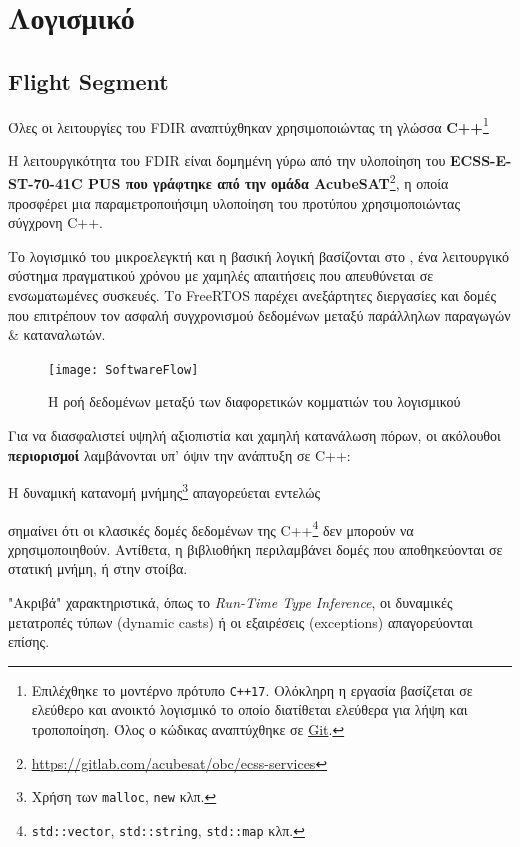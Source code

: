 \documentclass[a4paper,nobib]{tufte-book}
\begin{document}
\section{Λογισμικό}

\subsection{Flight Segment}

Όλες οι λειτουργίες του \ac{FDIR} αναπτύχθηκαν χρησιμοποιώντας τη γλώσσα \textbf{C++}\footnote{Επιλέχθηκε το μοντέρνο πρότυπο \texttt{C++17}. Ολόκληρη η εργασία βασίζεται σε ελεύθερο και ανοικτό λογισμικό το οποίο διατίθεται ελεύθερα για λήψη και τροποποίηση. Όλος ο κώδικας αναπτύχθηκε σε \href{https://git-scm.com/}{Git}.}
	
	Η λειτουργικότητα του \ac{FDIR} είναι δομημένη γύρω από την υλοποίηση του \textbf{ECSS-E-ST-70-41C \ac{PUS} που γράφτηκε από την ομάδα AcubeSAT}\footnote{\url{https://gitlab.com/acubesat/obc/ecss-services}}, η οποία προσφέρει μια παραμετροποιήσιμη υλοποίηση του προτύπου χρησιμοποιώντας σύγχρονη C++.
	
	Το λογισμικό του μικροελεγκτή και η βασική λογική βασίζονται στο \textbf{}, ένα λειτουργικό σύστημα πραγματικού χρόνου με χαμηλές απαιτήσεις που απευθύνεται σε ενσωματωμένες συσκευές. Το FreeRTOS παρέχει ανεξάρτητες διεργασίες και δομές που επιτρέπουν τον ασφαλή συγχρονισμού δεδομένων μεταξύ παράλληλων παραγωγών \& καταναλωτών.
\begin{figure}[h]
	\texttt{[image: SoftwareFlow]}
	\caption{Η ροή δεδομένων μεταξύ των διαφορετικών κομματιών του λογισμικού}
	\label{sec:softwareflow}
\end{figure}

Για να διασφαλιστεί υψηλή αξιοπιστία και χαμηλή κατανάλωση πόρων, οι ακόλουθοι \textbf{περιορισμοί} λαμβάνονται υπ' όψιν την ανάπτυξη σε C++:
\begin{compactenum}
	\item Η δυναμική κατανομή μνήμης\footnote{Χρήση των \texttt{malloc}, \texttt{new} κλπ.} απαγορεύεται εντελώς
	\label{itm:malloc}
	\item {} σημαίνει ότι οι κλασικές δομές δεδομένων της C++\footnote{\texttt{std::vector}, \texttt{std::string}, \texttt{std::map} κλπ.} δεν μπορούν να χρησιμοποιηθούν. Αντίθετα, η βιβλιοθήκη  περιλαμβάνει δομές που αποθηκεύονται σε στατική μνήμη, ή στην στοίβα.
	\item "Ακριβά" χαρακτηριστικά, όπως το \emph{Run-Time Type Inference}, οι δυναμικές μετατροπές τύπων (dynamic casts) ή οι εξαιρέσεις (exceptions) απαγορεύονται επίσης.
\end{compactenum}
\end{document}
